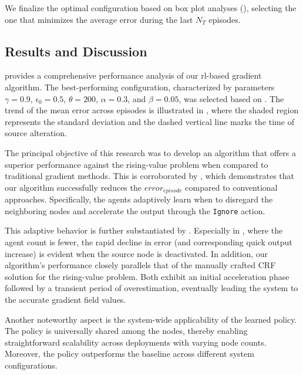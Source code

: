 We finalize the optimal configuration based on box plot analyses (), 
 selecting the one that minimizes the average error during the last $N_T$ episodes.


\subsection{Results and Discussion}
 provides a comprehensive performance analysis of our \acl{rl}-based gradient algorithm. 
 The best-performing configuration, characterized by parameters \(\gamma = 0.9\), \(\epsilon_0 = 0.5\), \(\theta = 200\), \(\alpha = 0.3\), and \(\beta = 0.05\), was selected based on . 
 The trend of the mean error across episodes is illustrated in , where the shaded region represents the standard deviation and the dashed vertical line marks the time of source alteration.

The principal objective of this research was to develop an algorithm that offers a superior performance against the rising-value problem when compared to traditional gradient methods. 
 This is corroborated by , which demonstrates that our algorithm successfully reduces the \(error_{episode}\) compared to conventional approaches. 
 Specifically, the agents adaptively learn when to disregard the neighboring nodes and accelerate the output through the \lstinline|Ignore| action.

This adaptive behavior is further substantiated by . Especially in , 
 where the agent count is fewer, the rapid decline in error (and corresponding quick output increase) is evident when the source node is deactivated. 
 In addition, our algorithm's performance closely parallels that of the manually crafted CRF solution for the rising-value problem. 
 Both exhibit an initial acceleration phase followed by a transient period of overestimation, eventually leading the system to the accurate gradient field values.

Another noteworthy aspect is the system-wide applicability of the learned policy. The policy is universally shared among the nodes, 
 thereby enabling straightforward scalability across deployments with varying node counts. 
 Moreover, the policy outperforms the baseline across different system configurations.

